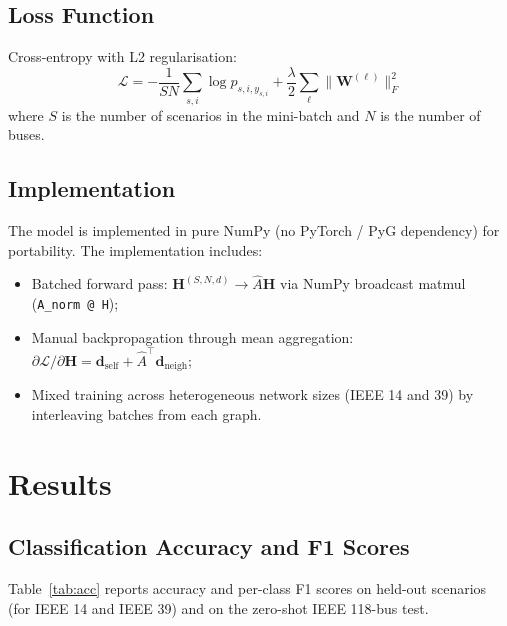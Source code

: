 \documentclass[11pt,a4paper]{article}
\begin{document}
\subsection{Loss Function}

Cross-entropy with L2 regularisation:
\begin{equation}
  \mathcal{L} = -\frac{1}{SN}\sum_{s,i}\log p_{s,i,y_{s,i}}
    + \frac{\lambda}{2}\sum_\ell \|\mathbf{W}^{(\ell)}\|_F^2
\end{equation}
where $S$ is the number of scenarios in the mini-batch and $N$ is the number
of buses.

\subsection{Implementation}

The model is implemented in pure NumPy (no PyTorch / PyG dependency)
for portability.  The implementation includes:
\begin{itemize}
  \item Batched forward pass: $\mathbf{H}^{(S,N,d)} \to \hat{A}\mathbf{H}$
        via NumPy broadcast matmul (\texttt{A\_norm @ H});
  \item Manual backpropagation through mean aggregation:
        $\partial\mathcal{L}/\partial\mathbf{H} = \mathbf{d}_\text{self}
         + \hat{A}^\top\mathbf{d}_\text{neigh}$;
  \item Mixed training across heterogeneous network sizes (IEEE 14 and 39)
        by interleaving batches from each graph.
\end{itemize}

\section{Results}
\label{sec:results}

\subsection{Classification Accuracy and F1 Scores}

Table~\ref{tab:acc} reports accuracy and per-class F1 scores on held-out
scenarios (for IEEE 14 and IEEE 39) and on the zero-shot IEEE 118-bus test.

\begin{table}[h]
\centering
\caption{GraphSAGE classification results. $\dagger$ = zero-shot network.}
\label{tab:acc}

\end{table}
\end{document}
